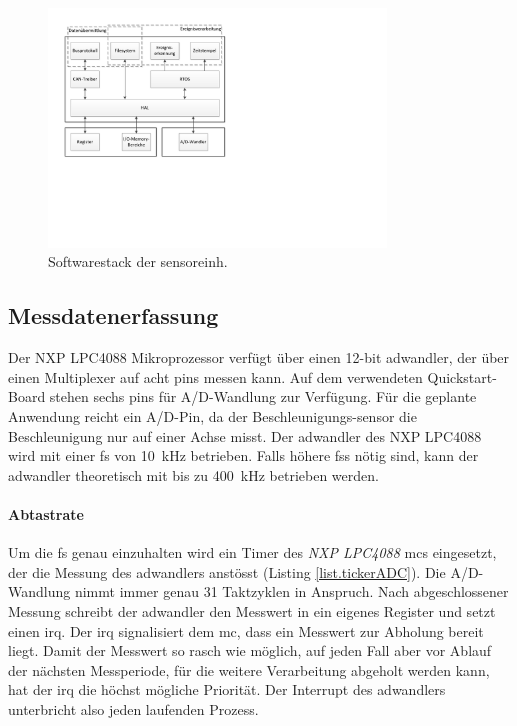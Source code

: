 \begin{figure}
	\centering
		\includegraphics[width=0.8\textwidth]{images/visio/Softwarestack_Sensor.pdf}
	\caption{Softwarestack der \gls{sensoreinh}.}
	\label{fig.sw_sensor}
\end{figure}



\subsection{Messdatenerfassung}\label{subsec.sw_messen}
Der NXP LPC4088 Mikroprozessor verfügt über einen 12-bit \gls{adwandler}, der über einen Multiplexer auf acht \glspl{pin} messen kann. Auf dem verwendeten Quickstart-Board stehen sechs \glspl{pin} für A/D-Wandlung zur Verfügung. Für die geplante Anwendung reicht ein A/D-Pin, da der Beschleunigungs-\gls{sensor} die Beschleunigung nur auf einer Achse misst. Der \gls{adwandler} des NXP LPC4088 wird mit einer \gls{fs} von 10~kHz betrieben. Falls höhere \glspl{fs} nötig sind, kann der \gls{adwandler} theoretisch mit bis zu 400~kHz betrieben werden.

\paragraph{Abtastrate} Um die \gls{fs} genau einzuhalten wird ein Timer des \emph{NXP LPC4088} \gls{mc}s eingesetzt, der die Messung des \gls{adwandler}s anstösst (Listing \ref{list.tickerADC}). Die A/D-Wandlung nimmt immer genau 31 Taktzyklen in Anspruch. Nach abgeschlossener Messung schreibt der \gls{adwandler} den Messwert in ein eigenes Register und setzt einen \gls{irq}. Der \gls{irq} signalisiert dem \gls{mc}, dass ein Messwert zur Abholung bereit liegt. Damit der Messwert so rasch wie möglich, auf jeden Fall aber vor Ablauf der nächsten Messperiode, für die weitere Verarbeitung abgeholt werden kann, hat der \gls{irq} die höchst mögliche Priorität. Der Interrupt des \gls{adwandler}s unterbricht also jeden laufenden Prozess.

